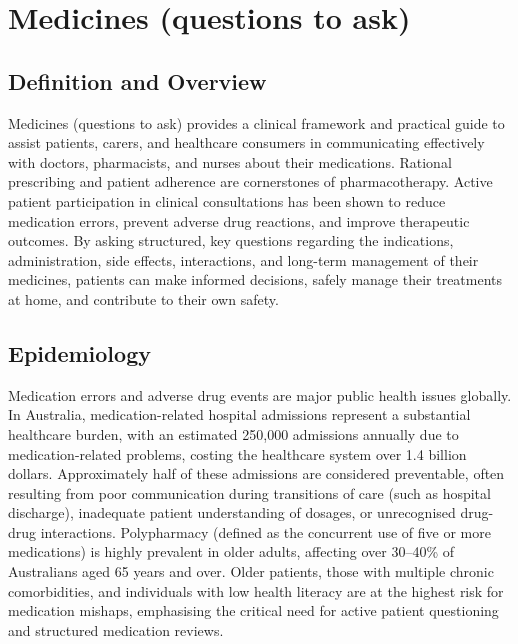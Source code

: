 \chapter{Medicines (questions to ask)}

\section*{Definition and Overview}
Medicines (questions to ask) provides a clinical framework and practical guide to assist patients, carers, and healthcare consumers in communicating effectively with doctors, pharmacists, and nurses about their medications. Rational prescribing and patient adherence are cornerstones of pharmacotherapy. Active patient participation in clinical consultations has been shown to reduce medication errors, prevent adverse drug reactions, and improve therapeutic outcomes. By asking structured, key questions regarding the indications, administration, side effects, interactions, and long-term management of their medicines, patients can make informed decisions, safely manage their treatments at home, and contribute to their own safety.

\section*{Epidemiology}
Medication errors and adverse drug events are major public health issues globally. In Australia, medication-related hospital admissions represent a substantial healthcare burden, with an estimated 250,000 admissions annually due to medication-related problems, costing the healthcare system over 1.4 billion dollars. Approximately half of these admissions are considered preventable, often resulting from poor communication during transitions of care (such as hospital discharge), inadequate patient understanding of dosages, or unrecognised drug-drug interactions. Polypharmacy (defined as the concurrent use of five or more medications) is highly prevalent in older adults, affecting over 30--40\% of Australians aged 65 years and over. Older patients, those with multiple chronic comorbidities, and individuals with low health literacy are at the highest risk for medication mishaps, emphasising the critical need for active patient questioning and structured medication reviews.

